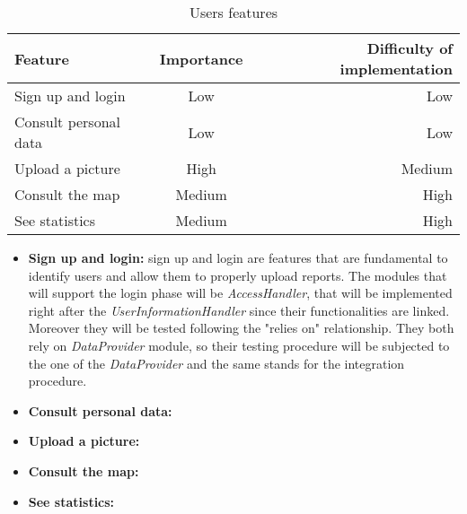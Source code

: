         \begin{table}[h!]
            \begin{center}
            
            \begin{tabular}{l|c|r} %
                \textbf{Feature} & \textbf{Importance} & \textbf{Difficulty of implementation}\\
                
                \hline
                Sign up and login & Low & Low\\
                Consult personal data & Low & Low\\
                Upload a picture & High & Medium\\
                Consult the map & Medium & High\\
                See statistics & Medium & High\\

            \end{tabular}
            \caption{Users features}
            \label{tab:table1}
            \end{center}
        \end{table}

        \begin{itemize}
            \item \textbf{Sign up and login:} sign up and login are features that are fundamental to identify users and allow them to 
                properly upload reports. The modules that will support the login phase will be \emph{AccessHandler}, that will be 
                implemented right after the \emph{UserInformationHandler} since their functionalities are linked. Moreover they 
                will be tested following the "relies on" relationship. They both rely on \emph{DataProvider} module, so their testing 
                procedure will be subjected to the one of the \emph{DataProvider} and the same stands for the integration procedure.
            \item \textbf{Consult personal data:} 
            \item \textbf{Upload a picture:}
            \item \textbf{Consult the map:}
            \item \textbf{See statistics:}
        \end{itemize}
       
        \clearpage

